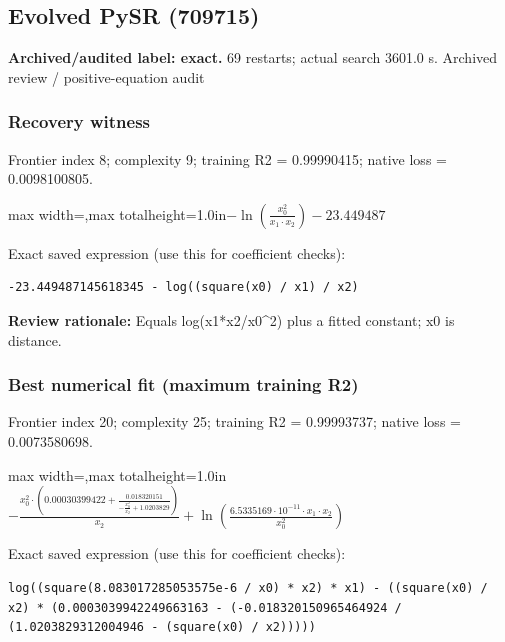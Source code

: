 \documentclass[10pt,letterpaper,landscape]{article}
\begin{document}
\begin{minipage}[t]{0.485\textwidth}
\subsection*{Evolved PySR (709715)}
\textbf{Archived/audited label: exact.} 69 restarts; actual search 3601.0 s.
{\small Archived review / positive-equation audit}
\subsubsection*{Recovery witness}
Frontier index 8; complexity 9; training R2 = 0.99990415; native loss = 0.0098100805.
\begin{center}\begin{adjustbox}{max width=\linewidth,max totalheight=1.0in}$\displaystyle - \ln{\left(\frac{x_{0}^{2}}{x_{1} \cdot x_{2}} \right)} - 23.449487$\end{adjustbox}\end{center}
{\scriptsize Exact saved expression (use this for coefficient checks):}
\begin{lstlisting}
-23.449487145618345 - log((square(x0) / x1) / x2)
\end{lstlisting}
{\small\textbf{Review rationale:} Equals log(x1*x2/x0\textasciicircum{}2) plus a fitted constant; x0 is distance.}
\subsubsection*{Best numerical fit (maximum training R2)}
Frontier index 20; complexity 25; training R2 = 0.99993737; native loss = 0.0073580698.
\begin{center}\begin{adjustbox}{max width=\linewidth,max totalheight=1.0in}$\displaystyle - \frac{x_{0}^{2} \cdot \left(0.00030399422 + \frac{0.018320151}{- \frac{x_{0}^{2}}{x_{2}} + 1.0203829}\right)}{x_{2}} + \ln{\left(\frac{6.5335169 \cdot 10^{-11} \cdot x_{1} \cdot x_{2}}{x_{0}^{2}} \right)}$\end{adjustbox}\end{center}
{\scriptsize Exact saved expression (use this for coefficient checks):}
\begin{lstlisting}
log((square(8.083017285053575e-6 / x0) * x2) * x1) - ((square(x0) / x2) * (0.0003039942249663163 - (-0.018320150965464924 / (1.0203829312004946 - (square(x0) / x2)))))
\end{lstlisting}
\end{minipage}
\clearpage{}\label{newton-10001}
\end{document}
